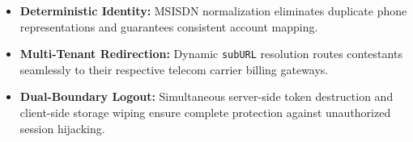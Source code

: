 \begin{tcolorbox}[summarybox, title={Chapter Key Takeaways}]
\begin{itemize}
    \item \textbf{Deterministic Identity:} MSISDN normalization eliminates duplicate phone representations and guarantees consistent account mapping.
    \item \textbf{Multi-Tenant Redirection:} Dynamic \texttt{subURL} resolution routes contestants seamlessly to their respective telecom carrier billing gateways.
    \item \textbf{Dual-Boundary Logout:} Simultaneous server-side token destruction and client-side storage wiping ensure complete protection against unauthorized session hijacking.
\end{itemize}
\end{tcolorbox}
